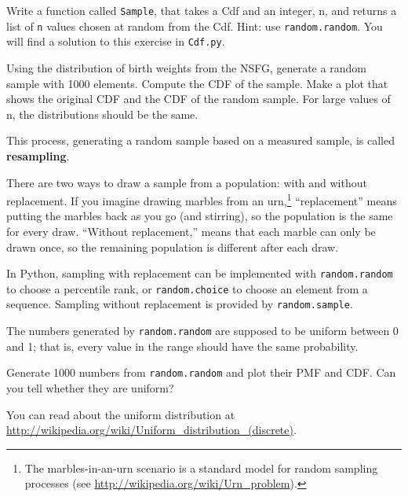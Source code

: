 \documentclass[12pt]{book}
\begin{document}
\begin{exercise}
Write a function called {\tt Sample}, that takes a Cdf and
an integer, n, and returns a list of {\tt n} values chosen at
random from the Cdf.  Hint: use {\tt random.random}.
You will find a solution to this exercise in {\tt Cdf.py}.

Using the distribution of birth weights from the NSFG, generate a
random sample with 1000 elements.  Compute the CDF of the sample.
Make a plot that shows the original CDF and the CDF of the random
sample.  For large values of n, the distributions should be
the same.

\end{exercise}

This process, generating a random sample based on a measured sample,
is called {\bf resampling}.

There are two ways to draw a sample from a population: with and
without replacement.  If you imagine drawing marbles from an
urn,\footnote{The marbles-in-an-urn scenario is a standard model for
  random sampling processes (see
  \url{http://wikipedia.org/wiki/Urn_problem}).} ``replacement'' means
putting the marbles back as you go (and stirring), so the population
is the same for every draw.  ``Without replacement,'' means that each
marble can only be drawn once, so the remaining population is
different after each draw.

In Python, sampling with replacement can be implemented with
{\tt random.random} to choose a percentile rank, or {\tt random.choice}
to choose an element from a sequence.  Sampling without replacement
is provided by {\tt random.sample}.

\begin{exercise}
The numbers generated by {\tt random.random} are supposed to be
uniform between 0 and 1; that is, every value in the range
should have the same probability.

Generate 1000 numbers from {\tt random.random} and plot their
PMF and CDF.  Can you tell whether they are uniform?

You can read about the uniform distribution at
\url{http://wikipedia.org/wiki/Uniform_distribution_(discrete)}.

\end{exercise}
\end{document}
